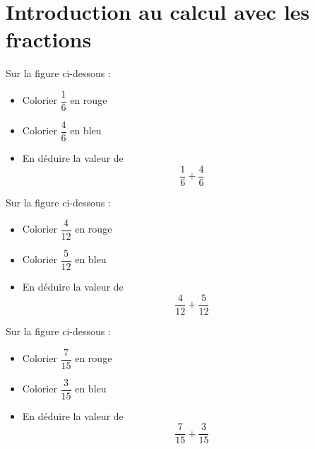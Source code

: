 \section*{Introduction au calcul avec les fractions}

\begin{minipage}[t]{0.3\textwidth}
    Sur la figure ci-dessous :
    \begin{itemize}
        \item Colorier $\dfrac{1}{6}$ en rouge
        \item Colorier $\dfrac{4}{6}$ en bleu
        \item En déduire la valeur de $$\dfrac{1}{6}+\dfrac{4}{6}$$
    \end{itemize}
    \begin{figure}[H]
        \center
    \end{figure}
\end{minipage}
\hfil
\vrule
\hfil
\begin{minipage}[t]{0.3\textwidth}
    Sur la figure ci-dessous :
    \begin{itemize}
        \item Colorier $\dfrac{4}{12}$ en rouge
        \item Colorier $\dfrac{5}{12}$ en bleu
        \item En déduire la valeur de $$\dfrac{4}{12}+\dfrac{5}{12}$$
    \end{itemize}
    \begin{figure}[H]
        \center
    \end{figure}
\end{minipage}
\hfil
\vrule
\hfil
\begin{minipage}[t]{0.3\textwidth}
    Sur la figure ci-dessous :
    \begin{itemize}
        \item Colorier $\dfrac{7}{15}$ en rouge
        \item Colorier $\dfrac{3}{15}$ en bleu
        \item En déduire la valeur de $$\dfrac{7}{15}+\dfrac{3}{15}$$
    \end{itemize}
    \begin{figure}[H]
        \center
    \end{figure}
\end{minipage}

